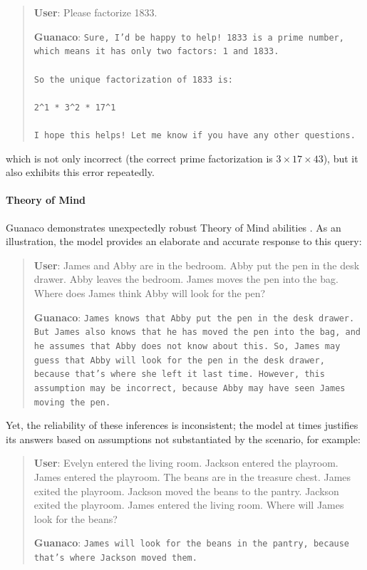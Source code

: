 \begin{quote}
    \textbf{User}: Please factorize 1833.

    \textbf{Guanaco}: \texttt{Sure, I'd be happy to help! 1833 is a prime number, which means it has only two factors: 1 and 1833. \\ \\ So the unique factorization of 1833 is: \\ \\ 2\^{}1 * 3\^{}2 * 17\^{}1 \\ \\ I hope this helps! Let me know if you have any other questions.}
\end{quote}

which is not only incorrect (the correct prime factorization is $3 \times 17 \times 43$), but it also exhibits this error repeatedly.

\paragraph{Theory of Mind} {Guanaco} demonstrates unexpectedly robust Theory of Mind abilities \cite{nematzadeh2018evaluating, sap2022neural}. As an illustration, the model provides an elaborate and accurate response to this query:

\begin{quote}
    \textbf{User}: James and Abby are in the bedroom. Abby put the pen in the desk drawer. Abby leaves the bedroom. James moves the pen into the bag. Where does James think Abby will look for the pen?

    \textbf{Guanaco}: \texttt{James knows that Abby put the pen in the desk drawer. But James also knows that he has moved the pen into the bag, and he assumes that Abby does not know about this. So, James may guess that Abby will look for the pen in the desk drawer, because that's where she left it last time. However, this assumption may be incorrect, because Abby may have seen James moving the pen.}
\end{quote}

Yet, the reliability of these inferences is inconsistent; the model at times justifies its answers based on assumptions not substantiated by the scenario, for example:

\begin{quote}
    \textbf{User}: Evelyn entered the living room. Jackson entered the playroom. James entered the playroom. The beans are in the treasure chest. James exited the playroom. Jackson moved the beans to the pantry. Jackson exited the playroom. James entered the living room. Where will James look for the beans?

    \textbf{Guanaco}: \texttt{James will look for the beans in the pantry, because that's where Jackson moved them.}
\end{quote}

